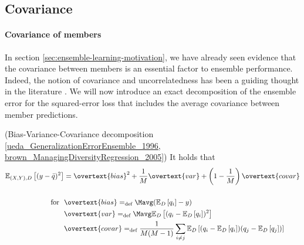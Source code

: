 \documentclass[../main.tex]{subfiles}
\begin{document}
\subsection{Covariance}
\label{sec:bias-variance-covariance}

\paragraph{Covariance of members}
In section \ref{sec:ensemble-learning-motivation}, we have already seen evidence that the covariance between members is an essential factor to ensemble performance. Indeed, the notion of covariance and uncorrelatedness has been a guiding thought in the literature \cite{didaci_DiversityClassifierEnsembles_2013, brown_ManagingDiversityRegression_2005, buschjager_GeneralizedNegativeCorrelation_2020}.
We will now introduce an exact decomposition of the ensemble error for the squared-error loss that includes the average covariance between member predictions.
\begin{theorem} (Bias-Variance-Covariance decomposition \ref{ueda_GeneralizationErrorEnsemble_1996, brown_ManagingDiversityRegression_2005})
  \label{thm:bias-variance-covariance}
It holds that
$$
\begin{align}
\mathbb{E}_{(X,Y),D}\left[ (y - \bar{q})^2 \right]  &= \overtext{bias}^2 + \frac{1}{M} \overtext{var} + \left( 1 - \frac{1}{M} \right) \overtext{covar} \\ \\ 
\text{for} ~ ~ & \overtext{bias} =_{\text{def}} \Mavg (\mathbb{E}_{D}\left[ q_{i}  \right] - y) \\
& \overtext{var} =_{\text{def}} \Mavg \mathbb{E}_{D}\left[ (q_{i} - \mathbb{E}_{D}\left[ q_{i} \right])^2  \right]  \\
& \overtext{covar} =_{\text{def}} \frac{1}{M(M-1)} \sum_{i \not= j} \mathbb{E}_{D}\left[ (q_{i} - \mathbb{E}_{D}\left[ q_{i} \right] ) (q_{j} - \mathbb{E}_{D}\left[ q_{j} \right] ) \right] 
\end{align}
$$
\end{theorem}
\end{document}
